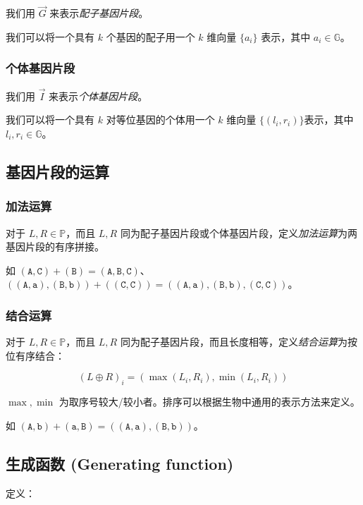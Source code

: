 \documentclass{article}
\begin{document}
我们用 $\vec G$ 来表示\textsl{配子基因片段}。

我们可以将一个具有 $k$ 个基因的配子用一个 $k$ 维向量 $\{a_i\}$ 表示，其中 $a_i \in \mathbb{G}$。

\subsubsection*{个体基因片段}

我们用 $\vec I$ 来表示\textsl{个体基因片段}。

我们可以将一个具有 $k$ 对等位基因的个体用一个 $k$ 维向量 $\{(l_i,r_i)\}$表示，其中 $l_i,r_i \in \mathbb{G}$。

\subsection{基因片段的运算}

\subsubsection*{加法运算}

对于 $L,R \in \mathbb{P}$，而且 $L,R$ 同为配子基因片段或个体基因片段，定义\textsl{加法运算}为两基因片段的有序拼接。

如 $(\texttt{A},\texttt{C}) + (\texttt{B}) = (\texttt{A},\texttt{B},\texttt{C})$、$((\texttt{A},\texttt{a}),(\texttt{B},\texttt{b}))+((\texttt{C},\texttt{C}))=((\texttt{A},\texttt{a}),(\texttt{B},\texttt{b}),(\texttt{C},\texttt{C}))$。

\subsubsection*{结合运算}

对于 $L,R \in \mathbb{P}$，而且 $L,R$ 同为配子基因片段，而且长度相等，定义\textsl{结合运算}为按位有序结合：

$$(L \oplus R)_i=(\max(L_i,R_i),\min(L_i,R_i))$$

$\max,\min$ 为取序号较大/较小者。排序可以根据生物中通用的表示方法来定义。

如 $(\texttt{A},\texttt{b}) + (\texttt{a},\texttt{B})=((\texttt{A},\texttt{a}),(\texttt{B},\texttt{b}))$。

\subsection{生成函数 (Generating function)} 

定义：
\end{document}

